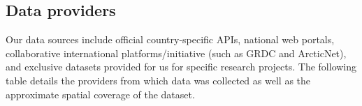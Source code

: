 \subsection{Data providers}



Our data sources include official country-specific APIs, national web portals, collaborative international platforms/initiative (such as GRDC and ArcticNet), and exclusive datasets provided for us for specific research projects. The following table details the providers from which data was collected as well as the approximate spatial coverage of the dataset.

